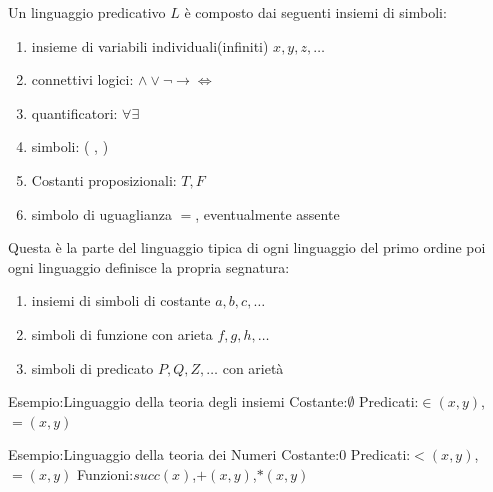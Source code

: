 \documentclass[a4paper]{book}
\begin{document}
Un linguaggio predicativo $L$ è composto dai seguenti insiemi di simboli:
\begin{enumerate}
    \item insieme di variabili individuali(infiniti) $x,y,z,\dots$
    \item connettivi logici: $\land \lor \neg \rightarrow \iff$
    \item quantificatori: $\forall \exists$
    \item simboli: ( , )
    \item Costanti proposizionali: $T,F$
    \item simbolo di uguaglianza $=$, eventualmente assente
\end{enumerate}
Questa è la parte del linguaggio tipica di ogni linguaggio del primo ordine poi ogni linguaggio definisce la propria segnatura:
\begin{enumerate}
    \item insiemi di simboli di costante $a,b,c,\dots$
    \item simboli di funzione con arieta $f,g,h,\dots$
    \item simboli di predicato $P,Q,Z,\dots$ con arietà
\end{enumerate}

Esempio:Linguaggio della teoria degli insiemi \newline
Costante:$\emptyset$\newline
Predicati:$\in(x,y)$, $=(x,y)$

Esempio:Linguaggio della teoria dei Numeri \newline
Costante:$0$ \newline
Predicati:$<(x,y)$,$=(x,y)$ \newline
Funzioni:$succ(x)$,$+(x,y)$,$*(x,y)$
\end{document}
